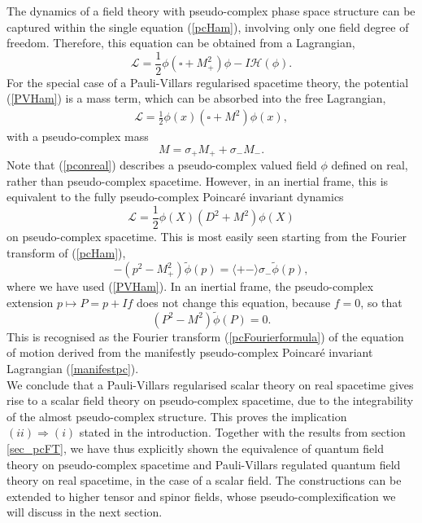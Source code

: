 \documentclass[a4paper,aps,prd,showkeys,showpacs,superscriptaddress,preprint]{revtex4}
\newcommand{\julve}[2]{\langle #1 #2 \rangle}
\begin{document}
The dynamics of a field theory with pseudo-complex phase space
structure can be captured within the single equation (\ref{pcHam}), 
involving only one field degree of freedom. Therefore, this equation can be
obtained from a Lagrangian,
\begin{equation}
  \mathcal{L} = \frac{1}{2} \phi (\square + M_+^2 ) \phi - I \mathcal{H}(\phi).
\end{equation}
For the special case of a Pauli-Villars regularised spacetime theory,
the potential (\ref{PVHam}) is a mass term, which can be absorbed into
the free Lagrangian,
\begin{eqnarray}\label{pconreal}
  \mathcal{L} = \frac{1}{2}\phi(x)(\square + M^2)\phi(x),
\end{eqnarray}
with a pseudo-complex mass
\begin{equation}
  M = \sigma_+ M_+ + \sigma_- M_-.
\end{equation}
Note that (\ref{pconreal}) describes a pseudo-complex valued field
$\phi$ defined on real, rather than pseudo-complex spacetime. However,
in an inertial frame, this is equivalent to the fully pseudo-complex
Poincar\'e invariant dynamics
\begin{equation}\label{manifestpc}
  \mathcal{L} = \frac{1}{2} \phi(X)(D^2 + M^2)\phi(X)
\end{equation}
on pseudo-complex spacetime. This is most easily seen starting from the Fourier
transform of (\ref{pcHam}),
\begin{equation}\label{almostpc}
  - (p^2 - M_+^2) \tilde\phi(p) = \julve{+}{-} \sigma_- \tilde\phi(p),
\end{equation}
where we have used (\ref{PVHam}). In an inertial frame, the
pseudo-complex extension $p \mapsto P = p + I f$ does not change this
equation, because $f=0$, so that
\begin{equation}
  (P^2 - M^2) \tilde\phi(P) = 0. 
\end{equation}
This is recognised as the Fourier transform (\ref{pcFourierformula}) of the equation of motion derived from the manifestly pseudo-complex
Poincar\'e invariant Lagrangian (\ref{manifestpc}).\\

We conclude that a Pauli-Villars regularised scalar theory on real spacetime
gives rise to a scalar field theory on pseudo-complex spacetime, due
to the integrability of the almost pseudo-complex structure.
This proves the implication $(ii) \Rightarrow (i)$ stated in the
introduction. Together with the results from section \ref{sec_pcFT},
we have thus explicitly shown the equivalence of quantum field theory on
pseudo-complex spacetime and Pauli-Villars regulated quantum field
theory on real spacetime, in the case of a scalar
field. The constructions can be extended to higher
tensor and spinor fields, whose pseudo-complexification we will discuss
in the next section.
\end{document}
